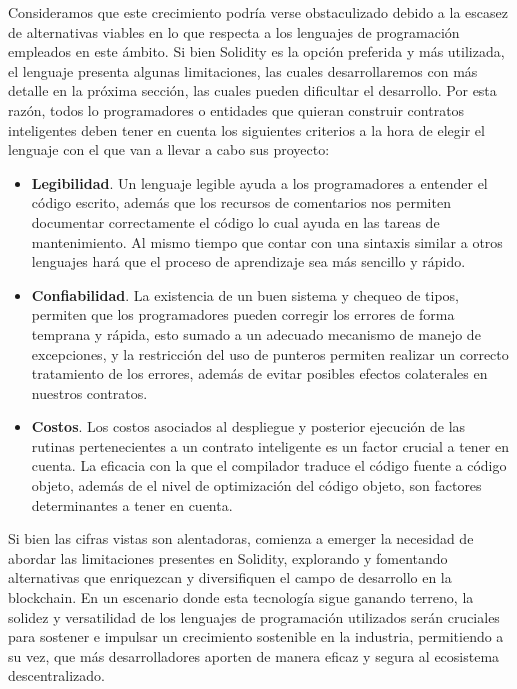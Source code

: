 \documentclass[a4paper,10pt]{article}
\begin{document}
	Consideramos que este crecimiento podría verse obstaculizado debido a la escasez de alternativas viables en lo que respecta a los lenguajes de programación empleados en este ámbito. Si bien Solidity es la opción preferida y más utilizada, el lenguaje presenta algunas limitaciones, las cuales desarrollaremos con más detalle en la próxima sección, las cuales pueden dificultar el desarrollo. Por esta razón, todos lo programadores o entidades que quieran construir contratos inteligentes deben tener en cuenta los siguientes criterios a la hora de elegir el lenguaje con el que van a llevar a cabo sus proyecto:
	\begin{itemize}
		\item \textbf{Legibilidad}. Un lenguaje legible ayuda a los programadores a entender el código escrito, además que los recursos de comentarios nos permiten documentar correctamente el código lo cual ayuda en las tareas de mantenimiento. Al mismo tiempo que contar con una sintaxis similar a otros lenguajes hará que el proceso de aprendizaje sea más sencillo y rápido.
		\item \textbf{Confiabilidad}. La existencia de un buen sistema y chequeo de tipos, permiten que los programadores pueden corregir los errores de forma temprana y rápida, esto sumado a un adecuado mecanismo de manejo de excepciones, y la restricción del uso de punteros permiten realizar un correcto tratamiento de los errores, además de evitar posibles efectos colaterales en nuestros contratos.
		\item \textbf{Costos}. Los costos asociados al despliegue y posterior ejecución de las rutinas pertenecientes a un contrato inteligente es un factor crucial a tener en cuenta. La eficacia con la que el compilador traduce el código fuente a código objeto, además de el nivel de optimización del código objeto, son factores determinantes a tener en cuenta.
	\end{itemize}
	Si bien las cifras vistas son alentadoras, comienza a emerger la necesidad de abordar las limitaciones presentes en Solidity, explorando y fomentando alternativas que enriquezcan y diversifiquen el campo de desarrollo en la blockchain. En un escenario donde esta tecnología sigue ganando terreno, la solidez y versatilidad de los lenguajes de programación utilizados serán cruciales para sostener e impulsar un crecimiento sostenible en la industria, permitiendo a su vez, que más desarrolladores aporten de manera eficaz y segura al ecosistema descentralizado.
\end{document}
